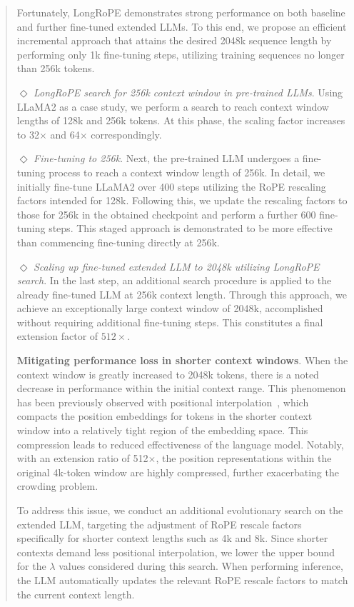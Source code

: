 \begin{abstract}
Fortunately, LongRoPE demonstrates strong performance on both baseline and further fine-tuned extended LLMs. To this end, we propose an efficient incremental approach that attains the desired 2048k sequence length by performing only 1k fine-tuning steps, utilizing training sequences no longer than 256k tokens.

$\Diamond$ \textit{LongRoPE search for 256k context window in pre-trained LLMs}. Using LLaMA2 as a case study, we perform a search to reach context window lengths of 128k and 256k tokens. At this phase, the scaling factor increases to 32$\times$ and 64$\times$ correspondingly.

$\Diamond$ \textit{Fine-tuning to 256k}. Next, the pre-trained LLM undergoes a fine-tuning process to reach a context window length of 256k. In detail, we initially fine-tune LLaMA2 over 400 steps utilizing the RoPE rescaling factors intended for 128k. Following this, we update the rescaling factors to those for 256k in the obtained checkpoint and perform a further 600 fine-tuning steps. This staged approach is demonstrated to be more effective than commencing fine-tuning directly at 256k.

$\Diamond$ \textit{Scaling up fine-tuned extended LLM to 2048k utilizing LongRoPE search}. In the last step, an additional search procedure is applied to the already fine-tuned LLM at 256k context length. Through this approach, we achieve an exceptionally large context window of 2048k, accomplished without requiring additional fine-tuning steps. This constitutes a final extension factor of $512\times$.

\textbf{Mitigating performance loss in shorter context windows}. When the context window is greatly increased to 2048k tokens, there is a noted decrease in performance within the initial context range. This phenomenon has been previously observed with positional interpolation~\cite{pi}, which compacts the position embeddings for tokens in the shorter context window into a relatively tight region of the embedding space. This compression leads to reduced effectiveness of the language model. Notably, with an extension ratio of 512$\times$, the position representations within the original 4k-token window are highly compressed, further exacerbating the crowding problem.

To address this issue, we conduct an additional evolutionary search on the extended LLM, targeting the adjustment of RoPE rescale factors specifically for shorter context lengths such as 4k and 8k. Since shorter contexts demand less positional interpolation, we lower the upper bound for the $\lambda$ values considered during this search. When performing inference, the LLM automatically updates the relevant RoPE rescale factors to match the current context length.


\end{abstract}
